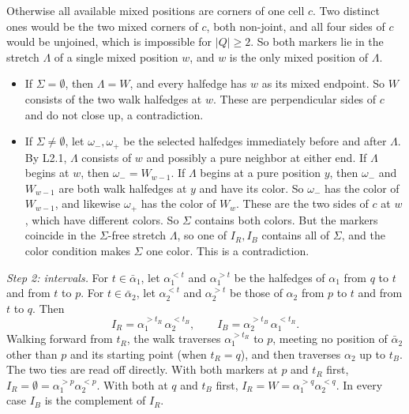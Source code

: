 \documentclass[
  11pt,
]{article}
\providecommand{\tightlist}{%
  \setlength{\itemsep}{0pt}\setlength{\parskip}{0pt}}
\begin{document}
Otherwise all available mixed positions are corners of one cell \(c\).
Two distinct ones would be the two mixed corners of \(c\), both
non-joint, and all four sides of \(c\) would be unjoined, which is
impossible for \(|Q|\ge2\). So both markers lie in the stretch
\(\Lambda\) of a single mixed position \(w\), and \(w\) is the only
mixed position of \(\Lambda\).

\begin{itemize}
\tightlist
\item
  If \(\Sigma=\emptyset\), then \(\Lambda=W\), and every halfedge has
  \(w\) as its mixed endpoint. So \(W\) consists of the two walk
  halfedges at \(w\). These are perpendicular sides of \(c\) and do not
  close up, a contradiction.
\item
  If \(\Sigma\ne\emptyset\), let \(\omega_-,\omega_+\) be the selected
  halfedges immediately before and after \(\Lambda\). By L2.1,
  \(\Lambda\) consists of \(w\) and possibly a pure neighbor at either
  end. If \(\Lambda\) begins at \(w\), then \(\omega_-=W_{w-1}\). If
  \(\Lambda\) begins at a pure position \(y\), then \(\omega_-\) and
  \(W_{w-1}\) are both walk halfedges at \(y\) and have its color. So
  \(\omega_-\) has the color of \(W_{w-1}\), and likewise \(\omega_+\)
  has the color of \(W_w\). These are the two sides of \(c\) at \(w\),
  which have different colors. So \(\Sigma\) contains both colors. But
  the markers coincide in the \(\Sigma\)-free stretch \(\Lambda\), so
  one of \(I_R,I_B\) contains all of \(\Sigma\), and the color condition
  makes \(\Sigma\) one color. This is a contradiction.
\end{itemize}

\emph{Step 2: intervals.} For \(t\in\bar\alpha_1\), let
\(\alpha_1^{<t}\) and \(\alpha_1^{>t}\) be the halfedges of \(\alpha_1\)
from \(q\) to \(t\) and from \(t\) to \(p\). For \(t\in\bar\alpha_2\),
let \(\alpha_2^{<t}\) and \(\alpha_2^{>t}\) be those of \(\alpha_2\)
from \(p\) to \(t\) and from \(t\) to \(q\). Then \[
I_R=\alpha_1^{>t_R}\,\alpha_2^{<t_B},\qquad I_B=\alpha_2^{>t_B}\,\alpha_1^{<t_R}.
\] Walking forward from \(t_R\), the walk traverses \(\alpha_1^{>t_R}\)
to \(p\), meeting no position of \(\bar\alpha_2\) other than \(p\) and
its starting point (when \(t_R=q\)), and then traverses \(\alpha_2\) up
to \(t_B\). The two ties are read off directly. With both markers at
\(p\) and \(t_R\) first, \(I_R=\emptyset=\alpha_1^{>p}\alpha_2^{<p}\).
With both at \(q\) and \(t_B\) first,
\(I_R=W=\alpha_1^{>q}\alpha_2^{<q}\). In every case \(I_B\) is the
complement of \(I_R\).
\end{document}
